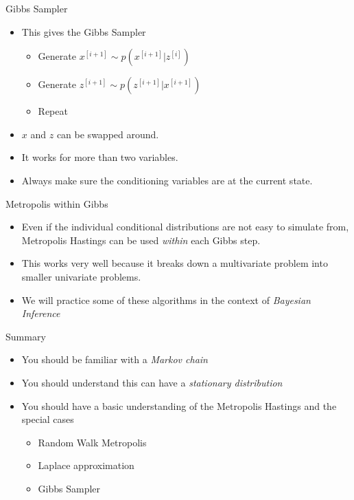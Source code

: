 \documentclass[10pt]{beamer}
\begin{document}
\begin{frame}{Gibbs Sampler}
\begin{itemize}
\item This gives the Gibbs Sampler

\begin{itemize}
\item Generate $x^{[i+1]}\sim p(x^{[i+1]}|z^{[i]})$
\item Generate $z^{[i+1]}\sim p(z^{[i+1]}|x^{[i+1]})$
\item Repeat
\end{itemize}

\item $x$ and $z$ can be swapped around.

\item It works for more than two variables.

\item Always make sure the conditioning variables are at the current state.
\end{itemize}
\end{frame}
\begin{frame}{Metropolis within Gibbs}
\begin{itemize}
\item Even if the individual conditional distributions are not easy to simulate from, Metropolis Hastings can be used {\em within} each Gibbs step.

\item This works very well because it breaks down a multivariate problem into smaller univariate problems.

\item We will practice some of these algorithms in the context of {\em Bayesian Inference}
\end{itemize}
\end{frame}
\begin{frame}{Summary}
\begin{itemize}
\item You should be familiar with a {\em Markov chain}

\item You should understand this can have a {\em stationary distribution}

\item You should have a basic understanding of the Metropolis Hastings and the special cases

\begin{itemize}
\item Random Walk Metropolis
\item Laplace approximation
\item Gibbs Sampler
\end{itemize}
\end{itemize}
\end{frame}
\end{document}
